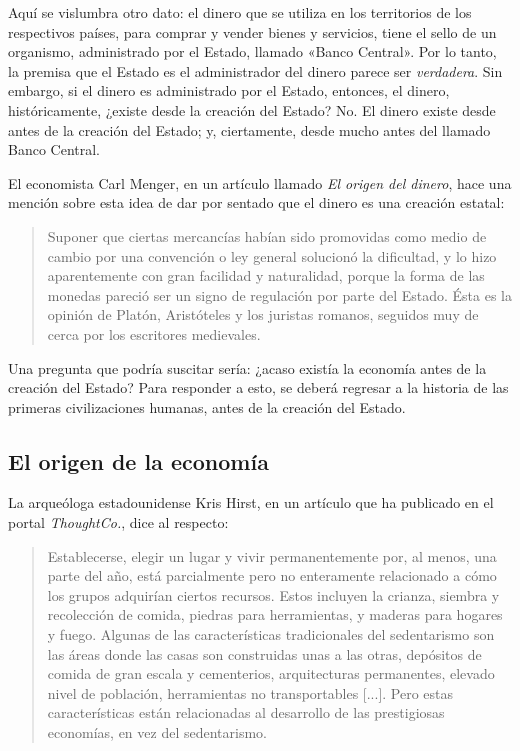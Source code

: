 \documentclass[12pt,a4paper,twoside]{book}
\begin{document}
Aquí se vislumbra otro dato: el dinero que se utiliza en los territorios de los respectivos países, para comprar y vender bienes y servicios, tiene el sello de un organismo, administrado por el Estado, llamado «Banco Central». Por lo tanto, la premisa que el Estado es el administrador del dinero parece ser \textit{verdadera}. Sin embargo, si el dinero es administrado por el Estado, entonces, el dinero, históricamente, ¿existe desde la creación del Estado? No. El dinero existe desde  antes de la creación del Estado; y, ciertamente, desde mucho antes del llamado Banco Central.

El economista Carl Menger, en un artículo llamado \textit{El origen del dinero}, hace una mención sobre esta idea de dar por sentado que el dinero es una creación estatal:

\begin{quotation}
Suponer que ciertas mercancías habían sido promovidas como medio de cambio por una convención o ley general solucionó la dificultad, y lo hizo aparentemente con gran facilidad y naturalidad, porque la forma de las monedas pareció ser un signo de regulación por parte del Estado. Ésta es la opinión de Platón, Aristóteles y los juristas romanos, seguidos muy de cerca por los escritores medievales. \cite[págs. 240-241]{menger:origen}
\end{quotation}

Una pregunta que podría suscitar sería: ¿acaso existía la economía antes de la creación del Estado? Para responder a esto, se deberá regresar a la historia de las primeras civilizaciones humanas, antes de la creación del Estado.

\subsection{El origen de la economía}
La arqueóloga estadounidense Kris Hirst, en un artículo que ha publicado en el portal \textit{ThoughtCo.}, dice al respecto:

\begin{quotation}
Establecerse, elegir un lugar y vivir permanentemente por, al menos, una parte del año, está parcialmente pero no enteramente relacionado a cómo los grupos adquirían ciertos recursos. Estos incluyen la crianza, siembra y recolección de comida, piedras para herramientas, y maderas para hogares y fuego. Algunas de las características tradicionales del sedentarismo son las áreas donde las casas son construidas unas a las otras, depósitos de comida de gran escala y cementerios, arquitecturas permanentes, elevado nivel de población, herramientas no transportables [...]. Pero estas características están relacionadas al desarrollo de las prestigiosas economías, en vez del sedentarismo. \cite{krishirst}
\end{quotation}
\end{document}
